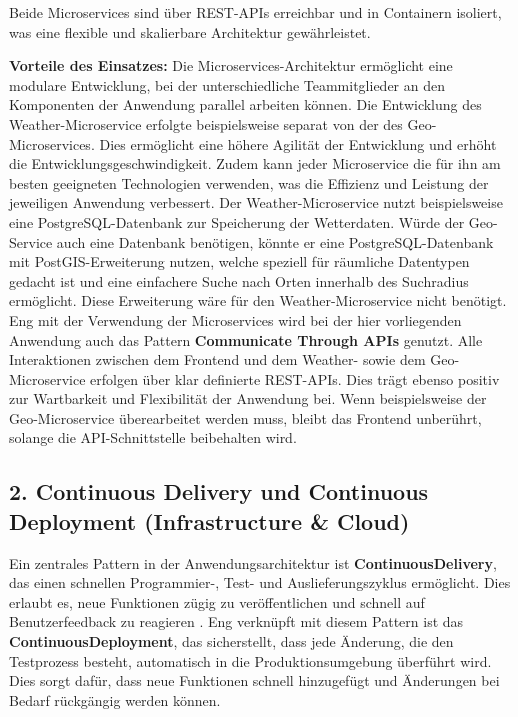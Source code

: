 Beide Microservices sind über REST-APIs erreichbar und in Containern isoliert, was eine flexible und skalierbare Architektur gewährleistet.

\textbf{Vorteile des Einsatzes:} 
Die Microservices-Architektur ermöglicht eine modulare Entwicklung, bei der unterschiedliche Teammitglieder an den Komponenten der Anwendung parallel arbeiten können. Die Entwicklung des Weather-Microservice erfolgte beispielsweise separat von der des Geo-Microservices. Dies ermöglicht eine höhere Agilität der Entwicklung und erhöht die Entwicklungsgeschwindigkeit. Zudem kann jeder Microservice die für ihn am besten geeigneten Technologien verwenden, was die Effizienz und Leistung der jeweiligen Anwendung verbessert. Der Weather-Microservice nutzt beispielsweise eine PostgreSQL-Datenbank zur Speicherung der Wetterdaten. Würde der Geo-Service auch eine Datenbank benötigen, könnte er eine PostgreSQL-Datenbank mit PostGIS-Erweiterung nutzen, welche speziell für räumliche Datentypen gedacht ist und eine einfachere Suche nach Orten innerhalb des Suchradius ermöglicht. Diese Erweiterung wäre für den Weather-Microservice nicht benötigt.\\

Eng mit der Verwendung der Microservices wird bei der hier vorliegenden Anwendung auch das Pattern \textbf{Communicate Through APIs} genutzt. Alle Interaktionen zwischen dem Frontend und dem Weather- sowie dem Geo-Microservice erfolgen über klar definierte REST-APIs. Dies trägt ebenso positiv zur Wartbarkeit und Flexibilität der Anwendung bei. Wenn beispielsweise der Geo-Microservice überearbeitet werden muss, bleibt das Frontend unberührt, solange die API-Schnittstelle beibehalten wird.

\subsection{2. Continuous Delivery und Continuous Deployment (Infrastructure \& Cloud)}

Ein zentrales Pattern in der Anwendungsarchitektur ist \textbf{ContinuousDelivery}, das einen schnellen Programmier-, Test- und Auslieferungszyklus ermöglicht. Dies erlaubt es, neue Funktionen zügig zu veröffentlichen und schnell auf Benutzerfeedback zu reagieren \cite{ContinuousDelivery}. Eng verknüpft mit diesem Pattern ist das \textbf{ContinuousDeployment}, das sicherstellt, dass jede Änderung, die den Testprozess besteht, automatisch in die Produktionsumgebung überführt wird. Dies sorgt dafür, dass neue Funktionen schnell hinzugefügt und Änderungen bei Bedarf rückgängig werden können.\cite{ContinuousDeployment}

